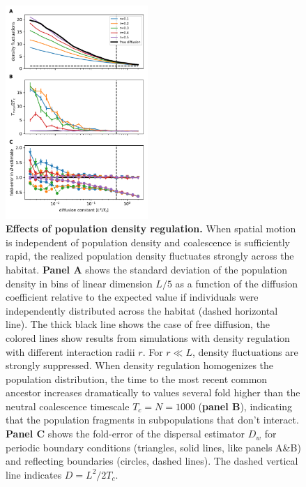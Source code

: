 \documentclass[aps,rmp, twocolumn]{revtex4}
\begin{document}
\begin{figure}[!h]
    \includegraphics[width=0.48\textwidth]{figures/Fig3}
    \caption{\label{fig:density_reg}  {\bf Effects of population density regulation.}
    When spatial motion is independent of population density and coalescence is sufficiently rapid, the realized population density fluctuates strongly across the habitat.
    {\bf Panel A} shows the standard deviation of the population density in bins of linear dimension $L/5$ as a function of the diffusion coefficient relative to the expected value if individuals were independently distributed across the habitat (dashed horizontal line). The thick black line shows the case of free diffusion, the colored lines show results from simulations with density regulation with different interaction radii $r$.
    For $r\ll L$, density fluctuations are strongly suppressed.
    When density regulation homogenizes the population distribution, the time to the most recent common ancestor increases dramatically to values several fold higher than the neutral coalescence timescale $T_c=N=1000$ ({\bf panel B}), indicating that the population fragments in subpopulations that don't interact.
    {\bf Panel C} shows the fold-error of the dispersal estimator $D_w$ for periodic boundary conditions (triangles, solid lines, like panels A\&B) and reflecting boundaries (circles, dashed lines).
    The dashed vertical line indicates $D=L^2/2T_c$.}
\end{figure}
\end{document}
